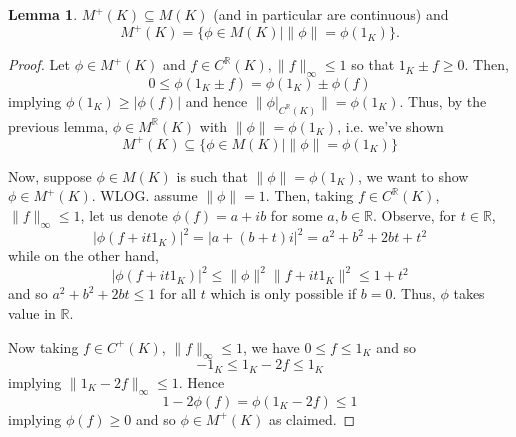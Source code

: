 \documentclass[]{article}
\theoremstyle{definition}
\newtheorem{lemma}{Lemma}[section]
\begin{document}
\begin{lemma}
  \(M^+(K) \subseteq M(K)\) (and in particular are continuous) and 
  \[M^+(K) = \{\phi \in M(K) \mid \|\phi\| = \phi(1_K)\}.\]
\end{lemma}
\begin{proof}
  Let \(\phi \in M^+(K)\) and \(f \in C^\mathbb{R}(K), \|f\|_\infty \le 1\) so that \(1_K \pm f \ge 0\).
  Then,
  \[0 \le \phi(1_K \pm f) = \phi(1_K) \pm \phi(f)\]
  implying \(\phi(1_K) \ge |\phi(f)|\) and hence \(\|\phi|_{C^\mathbb{R}(K)}\| = \phi(1_K)\).
  Thus, by the previous lemma, \(\phi \in M^\mathbb{R}(K)\) with \(\|\phi\| = \phi(1_K)\), i.e. 
  we've shown
  \[M^+(K) \subseteq \{\phi \in M(K) \mid \|\phi\| = \phi(1_K)\}\]

  Now, suppose \(\phi \in M(K)\) is such that \(\|\phi\| = \phi(1_K)\), we want to show 
  \(\phi \in M^+(K)\). WLOG. assume \(\|\phi\| = 1\). Then, taking \(f \in C^\mathbb{R}(K)\), 
  \(\|f\|_\infty \le 1\), let us denote \(\phi(f) = a + ib\) for some \(a, b \in \mathbb{R}\). 
  Observe, for \(t \in \mathbb{R}\), 
  \[|\phi(f + it1_K)|^2 = |a + (b + t)i|^2 = a^2 +b^2 + 2bt + t^2\]
  while on the other hand, 
  \[|\phi(f + it1_K)|^2 \le \|\phi\|^2 \|f + it1_K\|^2 \le 1 + t^2\]
  and so \( a^2 +b^2 + 2bt \le 1\) for all \(t\) which is only possible if \(b = 0\). Thus, 
  \(\phi\) takes value in \(\mathbb{R}\). 

  Now taking \(f \in C^+(K)\), \(\|f\|_\infty \le 1\), we have \(0 \le f \le 1_K\) and so 
  \[-1_K \le 1_K - 2f \le 1_K\]
  implying \(\|1_K - 2f\|_\infty \le 1\). Hence 
  \[1 - 2\phi(f) = \phi(1_K - 2f) \le 1\]
  implying \(\phi(f) \ge 0\) and so \(\phi \in M^+(K)\) as claimed.
\end{proof}
\end{document}
